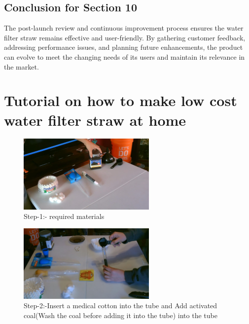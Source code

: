 \documentclass{article}
\begin{document}
\vspace{0.5cm}

\subsection*{Conclusion for Section 10}
The post-launch review and continuous improvement process ensures the water filter straw remains effective and user-friendly. By gathering customer feedback, addressing performance issues, and planning future enhancements, the product can evolve to meet the changing needs of its users and maintain its relevance in the market.


\newpage 
\section*{\hspace{0.7cm} \textbf{Tutorial on how to make low cost water filter straw at home} }


\begin{figure}[h!]
    \centering
    \includegraphics[width=0.6\textwidth]{DIY/materials-1.jpg}
    \caption{Step-1:- required materials}
    \label{fig:market}
\end{figure}


\begin{figure}[h!]
    \centering
    \includegraphics[width=0.6\textwidth]{DIY/materials-4.jpg}
    \caption{Step-2:-Insert a medical cotton into the tube and Add activated coal(Wash the coal before adding it into the tube) into the tube}
    \label{fig:market}
\end{figure}
\end{document}
